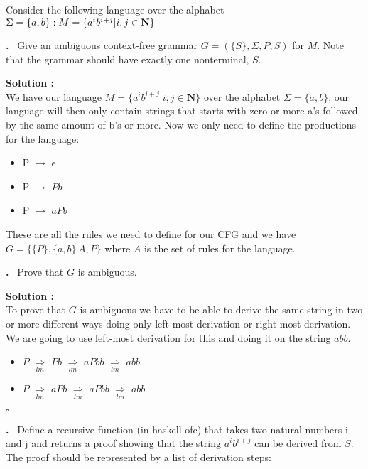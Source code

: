\documentclass{article}
\newcounter{problem}
\newcounter{solution}
\newcounter{step}
\newcommand\Problem{%
  \stepcounter{problem}%
  \textbf{\theproblem.}~%
  \setcounter{solution}{0}%
  \setcounter{step}{0}%
}
\newcommand\TheSolution{%
  \setcounter{step}{0}%
  \textbf{Solution \theproblem:}\\%
}
\begin{document}
\begin{center}
\end{center}

Consider the following language over the alphabet $\Sigma = \{a,b\}: 
\newline M=\{a^ib^{i+j}|i,j \in \mathbf{N}\}$

\Problem Give an ambiguous context-free grammar $G = (\{S\}, \Sigma, P, S)$ for $M$. Note that the grammar
should have exactly one nonterminal, $S$.

\TheSolution We have our language $M = \{a^ib^{i+j} | i,j \in \mathbf{N}\}$ over the alphabet $\Sigma = 
\{a,b\}$, our language will then only contain strings that starts with zero or more a's followed by the same 
amount of b's or more. Now we only need to define the productions for the language:

\begin{itemize}
  \item[] P $\rightarrow$ $\epsilon$
  \item[] P $\rightarrow$ $Pb$
  \item[] P $\rightarrow$ $aPb$
\end{itemize}

These are all the rules we need to define for our CFG and we have \newline $G = \{\{P\}, \{a,b\}\, A, P\}$ where
$A$ is the set of rules for the language.

\Problem Prove that $G$ is ambiguous.

\TheSolution
To prove that $G$ is ambiguous we have to be able to derive the same string in two or more different ways 
doing only left-most derivation or right-most derivation. We are going to use left-most 
derivation for this and doing it on the string $abb$.

\begin{itemize}
  \item[] $P$ $\underset{lm}{\Rightarrow}$ $Pb$ $\underset{lm}{\Rightarrow}$ $aPbb$ $\underset{lm}{\Rightarrow}$ $abb$ 
  \item[] $P$ $\underset{lm}{\Rightarrow}$ $aPb$ $\underset{lm}{\Rightarrow}$ $aPbb$ $\underset{lm}{\Rightarrow}$ $abb$
\end{itemize}
\hfill $\square$

\newpage
\Problem Define a recursive function (in haskell ofc) that takes two natural numbers i and j and returns
a proof showing that the string $a^ib^{i+j}$ can be derived from $S$. The proof should be represented by a 
list of derivation steps:
\end{document}
